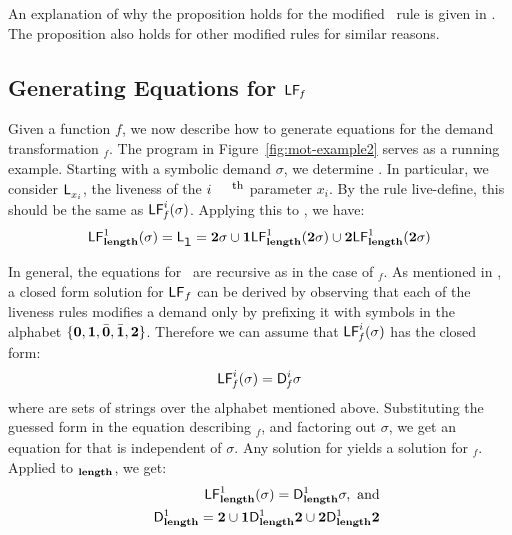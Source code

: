 \documentclass[preprint, 9pt]{sigplanconf}
\begin{document}
An  explanation of  why the  proposition holds  for the
modified  \CONS\ rule  is  given in  \cite{asati14lgc}.
The proposition also holds for other modified rules for
similar reasons.


\subsection{Generating Equations for $\mathsf{LF}_{\mathit f}$}
Given a  function $\mathit{f}$, we now  describe how to
generate  equations   for  the   demand  transformation
\Lfonly$_\mathit{f}$.        The       program       in
Figure~\ref{fig:mot-example2}   serves  as   a  running
example.  Starting with a  symbolic demand $\sigma$, we
determine  .   In
particular, we  consider $\mathsf{L}_{{x_i}}^{}$,  the liveness
of the $i^{\mbox{\footnotesize th}}$ parameter $x_i$.   By   the   rule   {\sc
  live-define},   this   should    be   the   same   as
$\mathsf{LF}_{\mathit f}^{i}( {\mathit \sigma})$. Applying this to \length, we have:
$$
 \mathsf{LF}_{\mathit {\mathbf{length}}}^{1}( {\mathit \sigma}) = \mathsf{L}_{{\mbox{\tt l}}}^{} = {\mathbf{2}}\sigma \cup \mathbf{1}\mathsf{LF}_{\mathit {\mathbf{length}}}^{1}( {\mathit {{\mathbf{2}}}\sigma})
  \cup {\mathbf{2}}\mathsf{LF}_{\mathit {\mathbf{length}}}^{1}( {\mathit {{\mathbf{2}}}\sigma})
$$

In general, the equations for \Lfonly\ are recursive as
in the  case of  \Lfonly$_\mathit{f}$. As  mentioned in
\cite{asati14lgc},   a   closed   form   solution   for
$\mathsf{LF}_{\mathit \mathit{f}}$ can  be derived by  observing that
each of  the liveness rules  modifies a demand  only by
prefixing  it with  symbols  in  the alphabet  $\lbrace
\mathbf{0}, \mathbf{1},\bar{\mathbf{0}},  \bar{\mathbf{1}}, {\mathbf{2}}  \rbrace$. Therefore
we can  assume that $\mathsf{LF}_{\mathit f}^{i}( {\mathit \sigma})$ has  the closed
form:
\begin{eqnarray}
\label{eq:LF:DI}
  \mathsf{LF}_{\mathit f}^{i}( {\mathit \sigma}) = \mathsf{D}_{\mathit f}^{i}\sigma
\end{eqnarray}
where   are sets of strings  over the alphabet
mentioned above.  Substituting the  guessed form in the
equation   describing    \Lfonly$_{\mathit   f}$,   and
factoring  out   $\sigma$,  we  get  an   equation  for
  that   is  independent  of   $\sigma$.   Any
solution   for      yields  a   solution   for
\Lfonly$_{\mathit  f}$.   Applied to  \Lfonly$_{\mathit
  {\mathbf{length}}}$, we get:
  \begin{eqnarray*}
&&  \mathsf{LF}_{\mathit {\mathbf{length}} }^{1}( {\mathit \sigma}) = \mathsf{D}_{\mathit {\mathbf{length}}}^{1}\sigma,~\mbox{and}\\
&&   \mathsf{D}_{\mathit {\mathbf{length}}}^{1} = {\mathbf{2}} \cup \mathbf{1}\mathsf{D}_{\mathit {\mathbf{length}}}^{1}{\mathbf{2}}
       \cup {\mathbf{2}}\mathsf{D}_{\mathit {\mathbf{length}}}^{1}{{\mathbf{2}}}
  \end{eqnarray*}
\end{document}
